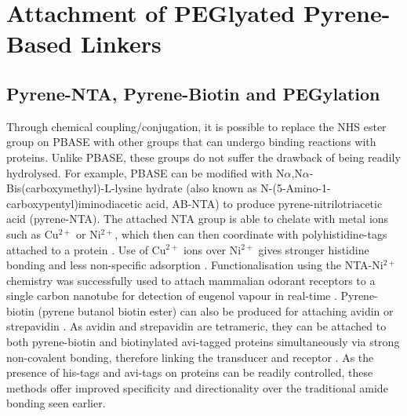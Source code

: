 \documentclass[
  a4paper,
]{scrbook}
\begin{document}
\hypertarget{attachment-of-peglyated-pyrene-based-linkers}{%
\section{Attachment of PEGlyated Pyrene-Based
Linkers}\label{attachment-of-peglyated-pyrene-based-linkers}}

\hypertarget{sec-NTA-biotin-PEG}{%
\subsection{Pyrene-NTA, Pyrene-Biotin and
PEGylation}\label{sec-NTA-biotin-PEG}}

Through chemical coupling/conjugation, it is possible to replace the NHS
ester group on PBASE with other groups that can undergo binding
reactions with proteins. Unlike PBASE, these groups do not suffer the
drawback of being readily hydrolysed. For example, PBASE can be modified
with N\(\alpha\),N\(\alpha\)-Bis(carboxymethyl)-L-lysine hydrate (also
known as N-(5-Amino-1-carboxypentyl)iminodiacetic acid, AB-NTA) to
produce pyrene-nitrilotriacetic acid (pyrene-NTA). The attached NTA
group is able to chelate with metal ions such as Cu\(^{2+}\) or
Ni\(^{2+}\), which then can then coordinate with polyhistidine-tags
attached to a protein \autocite{Holzinger2011,Amano2016,Chang2017}. Use
of Cu\(^{2+}\) ions over Ni\(^{2+}\) gives stronger histidine bonding
and less non-specific adsorption \autocite{Chang2017}. Functionalisation
using the NTA-Ni\(^{2+}\) chemistry was successfully used to attach
mammalian odorant receptors to a single carbon nanotube for detection of
eugenol vapour in real-time \autocite{Goldsmith2011}. Pyrene-biotin
(pyrene butanol biotin ester) can also be produced for attaching avidin
or strepavidin \autocite{Holzinger2011}. As avidin and strepavidin are
tetrameric, they can be attached to both pyrene-biotin and biotinylated
avi-tagged proteins simultaneously via strong non-covalent bonding,
therefore linking the transducer and receptor
\autocite{Star2003a,Dundas2013,Hermanson2013-11,Fairhead2015}. As the
presence of his-tags and avi-tags on proteins can be readily controlled,
these methods offer improved specificity and directionality over the
traditional amide bonding seen earlier.
\end{document}
